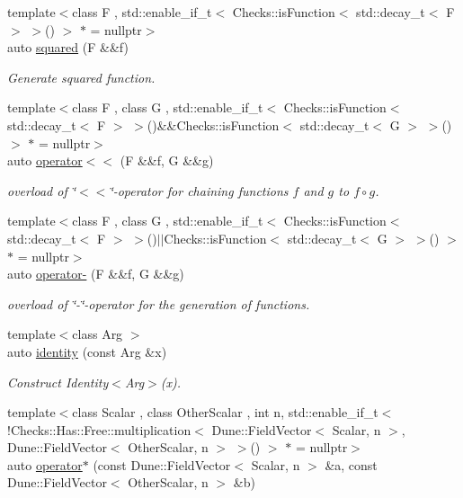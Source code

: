 \begin{DoxyCompactItemize}
{\footnotesize template$<$class F , std\-::enable\-\_\-if\-\_\-t$<$ Checks\-::is\-Function$<$ std\-::decay\-\_\-t$<$ F $>$ $>$() $>$ $\ast$  = nullptr$>$ }\\auto \hyperlink{namespacefuncy_aa9945efc39406185d6f6c4422e972c57}{squared} (F \&\&f)
\begin{DoxyCompactList}\small\item\em Generate squared function. \end{DoxyCompactList}\item 
{\footnotesize template$<$class F , class G , std\-::enable\-\_\-if\-\_\-t$<$ Checks\-::is\-Function$<$ std\-::decay\-\_\-t$<$ F $>$ $>$()\&\&\-Checks\-::is\-Function$<$ std\-::decay\-\_\-t$<$ G $>$ $>$() $>$ $\ast$  = nullptr$>$ }\\auto \hyperlink{namespacefuncy_a5322129ce0c105e5cfcd373925685ec6}{operator$<$$<$} (F \&\&f, G \&\&g)
\begin{DoxyCompactList}\small\item\em overload of \char`\"{}$<$$<$\char`\"{}-\/operator for chaining functions $f$ and $g$ to $ f \circ g $. \end{DoxyCompactList}\item 
{\footnotesize template$<$class F , class G , std\-::enable\-\_\-if\-\_\-t$<$ Checks\-::is\-Function$<$ std\-::decay\-\_\-t$<$ F $>$ $>$()$\vert$$\vert$\-Checks\-::is\-Function$<$ std\-::decay\-\_\-t$<$ G $>$ $>$() $>$ $\ast$  = nullptr$>$ }\\auto \hyperlink{namespacefuncy_aa21d1b0f4f14f3917367a836db904848}{operator-\/} (F \&\&f, G \&\&g)
\begin{DoxyCompactList}\small\item\em overload of \char`\"{}-\/\char`\"{}-\/operator for the generation of functions. \end{DoxyCompactList}\item 
{\footnotesize template$<$class Arg $>$ }\\auto \hyperlink{namespacefuncy_a04130b4d402d76481d257849ba0ce88d}{identity} (const Arg \&x)
\begin{DoxyCompactList}\small\item\em Construct Identity$<$\-Arg$>$(x). \end{DoxyCompactList}\item 
{\footnotesize template$<$class Scalar , class Other\-Scalar , int n, std\-::enable\-\_\-if\-\_\-t$<$ !\-Checks\-::\-Has\-::\-Free\-::multiplication$<$ Dune\-::\-Field\-Vector$<$ Scalar, n $>$, Dune\-::\-Field\-Vector$<$ Other\-Scalar, n $>$ $>$() $>$ $\ast$  = nullptr$>$ }\\auto \hyperlink{namespacefuncy_a8cc6f20ecf2e37a42cbf2f68f2c0b377}{operator$\ast$} (const Dune\-::\-Field\-Vector$<$ Scalar, n $>$ \&a, const Dune\-::\-Field\-Vector$<$ Other\-Scalar, n $>$ \&b)

\end{DoxyCompactItemize}
